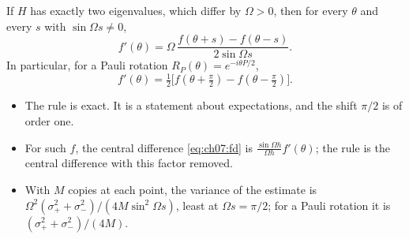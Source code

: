 \documentclass[handoutsbeamer.tex]{subfiles}
\begin{document}
\begin{frame}
\onp{\footnotesize}
\begin{thm}\label{thm:ch07:psr}
If $H$ has exactly two eigenvalues, which differ by $\Omega>0$, then for every $\theta$ and every $s$ with $\sin\Omega s\ne0$,
\begin{equation}\label{eq:ch07:psrs}
    f'(\theta) = \Omega\,\frac{f(\theta+s)-f(\theta-s)}{2\sin\Omega s}.
\end{equation}
In particular, for a Pauli rotation $R_P(\theta) = e^{-i\theta P/2}$,
\begin{equation}\label{eq:ch07:psr}
    f'(\theta) = \tfrac12\big[f(\theta+\tfrac\pi2)-f(\theta-\tfrac\pi2)\big].
\end{equation}
\end{thm}
\begin{itemize}\setlength\itemsep{0.2em}
    \item The rule is exact. It is a statement about expectations, and the shift $\pi/2$ is of order one.
    \item For such $f$, the central difference \eqref{eq:ch07:fd} is $\frac{\sin\Omega h}{\Omega h}f'(\theta)$; the rule is the central difference with this factor removed.
    \item With $M$ copies at each point, the variance of the estimate is $\Omega^2(\sigma_+^2+\sigma_-^2)/(4M\sin^2\Omega s)$, least at $\Omega s = \pi/2$; for a Pauli rotation it is $(\sigma_+^2+\sigma_-^2)/(4M)$.
\end{itemize}
\end{frame}
\end{document}
